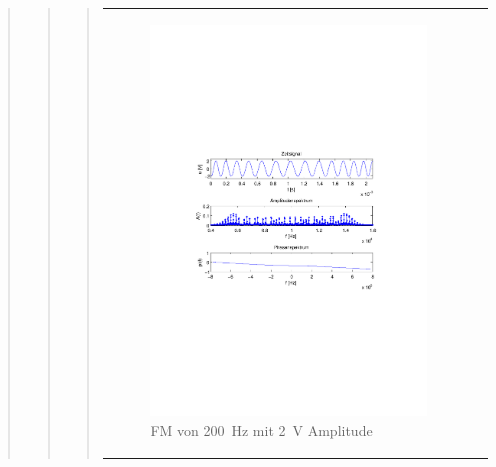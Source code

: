 \begin{quote}
\begin{quote}
\begin{quote}
\begin{center}
\begin{tabular}{ll}
                \begin{minipage}{0.6\textwidth}
                    \begin{figure}[H]
                        \includegraphics[scale=0.7, trim = 35mm 100mm 35mm 95mm, clip]{Bilder/f200_2}
                        \caption{FM von \SI{200}{\hertz} mit \SI{2}{\volt} Amplitude}
                        \label{fig:f100_1}
                    \end{figure}
                \end{minipage}
            
            \end{tabular}
            \end{center}            
        \end{quote}


        
        

\end{quote}
\end{quote}
